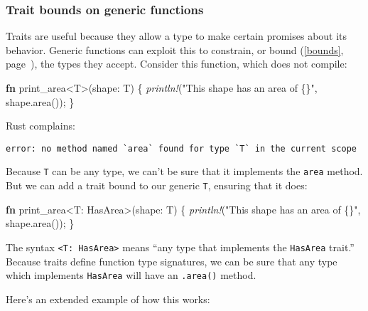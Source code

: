 \documentclass[a4paper,]{book}
\renewcommand*{\hyperlink}[2]{%
 #2 (\autoref{#1}, page~\pageref{#1})}
\newenvironment{Shaded}{\begin{snugshade}}{\end{snugshade}}
\newcommand{\KeywordTok}[1]{\textcolor[rgb]{0.13,0.29,0.53}{\textbf{{#1}}}}
\newcommand{\StringTok}[1]{\textcolor[rgb]{0.31,0.60,0.02}{{#1}}}
\newcommand{\PreprocessorTok}[1]{\textcolor[rgb]{0.56,0.35,0.01}{\textit{{#1}}}}
\newcommand{\NormalTok}[1]{{#1}}
\begin{document}
\subsubsection{Trait bounds on generic
functions}\label{trait-bounds-on-generic-functions}

Traits are useful because they allow a type to make certain promises
about its behavior. Generic functions can exploit this to constrain, or
\protect\hyperlink{bounds}{bound}, the types they accept. Consider this
function, which does not compile:

\begin{Shaded}
\begin{Highlighting}[]
\KeywordTok{fn} \NormalTok{print_area<T>(shape: T) \{}
    \PreprocessorTok{println!}\NormalTok{(}\StringTok{"This shape has an area of \{\}"}\NormalTok{, shape.area());}
\NormalTok{\}}
\end{Highlighting}
\end{Shaded}

Rust complains:

\begin{verbatim}
error: no method named `area` found for type `T` in the current scope
\end{verbatim}

Because \texttt{T} can be any type, we can't be sure that it implements
the \texttt{area} method. But we can add a trait bound to our generic
\texttt{T}, ensuring that it does:

\begin{Shaded}
\begin{Highlighting}[]
\KeywordTok{fn} \NormalTok{print_area<T: HasArea>(shape: T) \{}
    \PreprocessorTok{println!}\NormalTok{(}\StringTok{"This shape has an area of \{\}"}\NormalTok{, shape.area());}
\NormalTok{\}}
\end{Highlighting}
\end{Shaded}

The syntax \texttt{\textless{}T:\ HasArea\textgreater{}} means ``any
type that implements the \texttt{HasArea} trait.'' Because traits define
function type signatures, we can be sure that any type which implements
\texttt{HasArea} will have an \texttt{.area()} method.

Here's an extended example of how this works:
\end{document}
